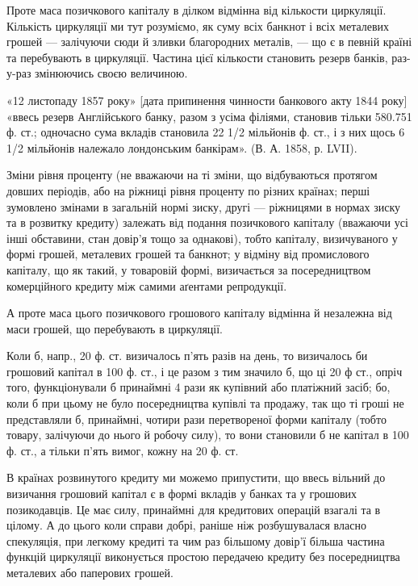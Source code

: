 Проте маса позичкового капіталу в ділком відмінна від кількости циркуляції.
Кількість циркуляції ми тут розуміємо, як суму всіх банкнот і всіх металевих
грошей — залічуючи сюди й зливки благородних металів, — що є в певній
країні та перебувають в циркуляції. Частина цієї кількости становить резерв
банків, раз-у-раз змінюючись своєю величиною.

«12 листопаду 1857 року» [дата припинення чинности банкового акту
1844 року] «ввесь резерв Англійського банку, разом з усіма філіями, становив
тільки 580.751 ф. ст.; одночасно сума вкладів становила 22 1/2 мільйонів ф. ст.,
і з них щось 6 1/2 мільйонів належало лондонським банкірам». (В. А. 1858, р. LVII).

Зміни рівня проценту (не вважаючи на ті зміни, що відбуваються протягом
довших періодів, або на ріжниці рівня проценту по різних країнах; перші
зумовлено змінами в загальній нормі зиску, другі — ріжницями в нормах зиску
та в розвитку кредиту) залежать від подання позичкового капіталу (вважаючи
усі інші обставини, стан довір’я тощо за однакові), тобто капіталу, визичуваного
у формі грошей, металевих грошей та банкнот; у відміну від промислового
капіталу, що як такий, у товаровій формі, визичається за посередництвом
комерційного кредиту між самими аґентами репродукції.

А проте маса цього позичкового грошового капіталу відмінна й незалежна
від маси грошей, що перебувають в циркуляції.

Коли б, напр., 20 ф. ст. визичалось п’ять разів на день, то визичалось би
грошовий капітал в 100 ф. ст., і це разом з тим значило б, що ці 20 ф ст.,
опріч того, функціонували б принаймні 4 рази як купівний або платіжний
засіб; бо, коли б при цьому не було посередництва купівлі та продажу, так
що ті гроші не представляли б, принаймні, чотири рази перетвореної форми
капіталу (тобто товару, залічуючи до нього й робочу силу), то вони становили б
не капітал в 100 ф. ст., а тільки п’ять вимог, кожну на 20 ф. ст.

В країнах розвинутого кредиту ми можемо припустити, що ввесь вільний до
визичання грошовий капітал є в формі вкладів у банках та у грошових позикодавців.
Це має силу, принаймні для кредитових операцій взагалі та в цілому. А до цього
коли справи добрі, раніше ніж розбушувалася власно спекуляція, при легкому кредиті
та чим раз більшому довір’ї більша частина функцій циркуляції виконується
простою передачею кредиту без посередництва металевих або паперових грошей.

